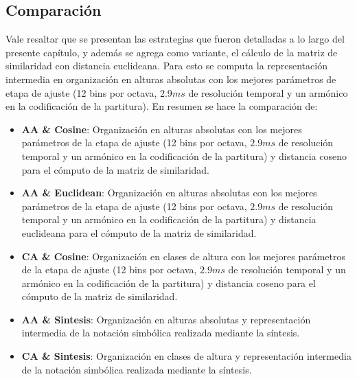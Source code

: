 \documentclass
  [ams,pdfout]%
	{aeslac}
\begin{document}
\subsection{Comparación}

Vale resaltar que se presentan las estrategias que fueron detalladas a lo largo del presente capítulo, y además se agrega como variante, el cálculo de la matriz de similaridad con distancia euclideana. Para esto se computa la representación intermedia en organización en alturas absolutas con los mejores parámetros de etapa de ajuste (12 bins por octava, $2.9ms$ de resolución temporal y un armónico en la codificación de la partitura). En resumen se hace la comparación de: 

\begin{itemize}

\item \textbf{AA \& Cosine}: Organización en alturas absolutas con los mejores parámetros de la etapa de ajuste (12 bins por octava, $2.9ms$ de resolución temporal y un armónico en la codificación de la partitura) y distancia coseno para el cómputo de la matriz de similaridad.
\item \textbf{AA \& Euclidean}: Organización en alturas absolutas con los mejores parámetros de la etapa de ajuste (12 bins por octava, $2.9ms$ de resolución temporal y un armónico en la codificación de la partitura) y distancia euclideana para el cómputo de la matriz de similaridad.
\item \textbf{CA \& Cosine}: Organización en clases de altura con los mejores parámetros de la etapa de ajuste (12 bins por octava, $2.9ms$ de resolución temporal y un armónico en la codificación de la partitura) y distancia coseno para el cómputo de la matriz de similaridad.
\item \textbf{AA \& Sintesis}: Organización en alturas absolutas y representación intermedia de la notación simbólica realizada mediante la síntesis.  
\item \textbf{CA \& Sintesis}: Organización en clases de altura y representación intermedia de la notación simbólica realizada mediante la síntesis. 

\end{itemize}
\end{document}

